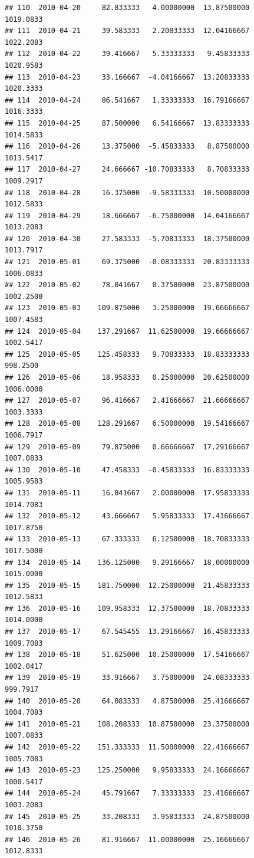 \documentclass[
]{article}
\begin{document}
\begin{verbatim}
## 110  2010-04-20     82.833333   4.00000000  13.87500000    1019.0833
## 111  2010-04-21     39.583333   2.20833333  12.04166667    1022.2083
## 112  2010-04-22     39.416667   5.33333333   9.45833333    1020.9583
## 113  2010-04-23     33.166667  -4.04166667  13.20833333    1020.3333
## 114  2010-04-24     86.541667   1.33333333  16.79166667    1016.3333
## 115  2010-04-25     87.500000   6.54166667  13.83333333    1014.5833
## 116  2010-04-26     13.375000  -5.45833333   8.87500000    1013.5417
## 117  2010-04-27     24.666667 -10.70833333   8.70833333    1009.2917
## 118  2010-04-28     16.375000  -9.58333333  10.50000000    1012.5833
## 119  2010-04-29     18.666667  -6.75000000  14.04166667    1013.2083
## 120  2010-04-30     27.583333  -5.70833333  18.37500000    1013.7917
## 121  2010-05-01     69.375000  -0.08333333  20.83333333    1006.0833
## 122  2010-05-02     78.041667   0.37500000  23.87500000    1002.2500
## 123  2010-05-03    109.875000   3.25000000  19.66666667    1007.4583
## 124  2010-05-04    137.291667  11.62500000  19.66666667    1002.5417
## 125  2010-05-05    125.458333   9.70833333  18.83333333     998.2500
## 126  2010-05-06     18.958333   0.25000000  20.62500000    1006.0000
## 127  2010-05-07     96.416667   2.41666667  21.66666667    1003.3333
## 128  2010-05-08    128.291667   6.50000000  19.54166667    1006.7917
## 129  2010-05-09     79.875000   0.66666667  17.29166667    1007.0833
## 130  2010-05-10     47.458333  -0.45833333  16.83333333    1005.9583
## 131  2010-05-11     16.041667   2.00000000  17.95833333    1014.7083
## 132  2010-05-12     43.666667   5.95833333  17.41666667    1017.8750
## 133  2010-05-13     67.333333   6.12500000  18.70833333    1017.5000
## 134  2010-05-14    136.125000   9.29166667  18.00000000    1015.0000
## 135  2010-05-15    181.750000  12.25000000  21.45833333    1012.5833
## 136  2010-05-16    109.958333  12.37500000  18.70833333    1014.0000
## 137  2010-05-17     67.545455  13.29166667  16.45833333    1009.7083
## 138  2010-05-18     51.625000  10.25000000  17.54166667    1002.0417
## 139  2010-05-19     33.916667   3.75000000  24.08333333     999.7917
## 140  2010-05-20     64.083333   4.87500000  25.41666667    1004.7083
## 141  2010-05-21    108.208333  10.87500000  23.37500000    1007.0833
## 142  2010-05-22    151.333333  11.50000000  22.41666667    1005.7083
## 143  2010-05-23    125.250000   9.95833333  24.16666667    1000.5417
## 144  2010-05-24     45.791667   7.33333333  23.41666667    1003.2083
## 145  2010-05-25     33.208333   3.95833333  24.87500000    1010.3750
## 146  2010-05-26     81.916667  11.00000000  25.16666667    1012.8333

\end{verbatim}
\end{document}
